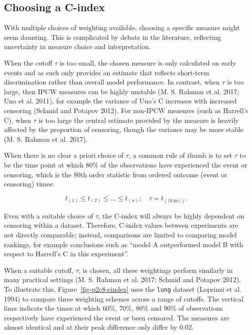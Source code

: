 \documentclass[
  letterpaper,
  krantz2]{style/krantz}
\begin{document}
\subsection{Choosing a C-index}\label{sec-eval-crank-choose}

With multiple choices of weighting available, choosing a specific
measure might seem daunting. This is complicated by debate in the
literature, reflecting uncertainty in measure choice and interpretation.

When the cutoff \(\tau\) is too small, the chosen measure is only
calculated on early events and as such only provides an estimate that
reflects short-term discrimination rather than overall model
performance. In contrast, when \(\tau\) is too large, then
IPCW measures can be
highly unstable (M. S. Rahman et al. 2017; Uno et al. 2011), for example
the variance of Uno's C increases with
increased censoring (Schmid and Potapov 2012). For non-IPCW measures
(such as Harrell's C), when
\(\tau\) is too large the central estimate provided by the measure is
heavily affected by the proportion of censoring, though the variance may
be more stable (M. S. Rahman et al. 2017).

When there is no clear a priori choice of \(\tau\), a common rule of
thumb is to set \(\tau\) to be the time point at which 80\% of the
observations have experienced the event or censoring, which is the 80th
order statistic from ordered outcome (event or censoring) times:

\[
t_{(1)} \leq t_{(2)} \leq \ldots \leq t_{(n)}; \quad \tau = t_{(\lceil 0.8n \rceil)}.
\]

Even with a suitable choice of \(\tau\), the C-index will always be
highly dependent on censoring within a dataset. Therefore, C-index
values between experiments are not directly comparable; instead,
comparisons are limited to comparing model rankings, for example
conclusions such as ``model A outperformed model B with respect to
Harrell's C in this experiment''.

When a suitable cutoff, \(\tau\), is chosen, all these weightings
perform similarly in many practical settings (M. S. Rahman et al. 2017;
Schmid and Potapov 2012). To illustrate this,
Figure~\ref{fig-p2c8-cindex} uses the \texttt{lung} dataset (Loprinzi et
al. 1994) to compare three weighting schemes across a range of cutoffs.
The vertical lines indicate the times at which 60\%, 70\%, 80\% and 90\%
of observations respectively have experienced the event or been
censored. The measures are almost identical and at their peak difference
only differ by 0.02.
\end{document}
